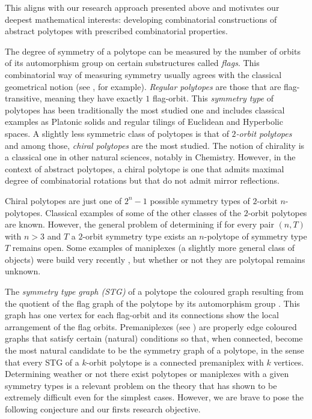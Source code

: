 \documentclass[a4paper,12pt,english]{article}
\begin{document}
This aligns with our research approach presented above and motivates our deepest mathematical interests: developing combinatorial constructions of abstract polytopes with prescribed combinatorial properties.





The degree of symmetry of a polytope can be measured by the number of orbits of its automorphism group on certain substructures called \emph{flags}.
This combinatorial way of measuring symmetry usually agrees with the classical geometrical notion (see \cite{DuVal1964_HomographiesQuaternionsRotations,Coxeter1973_RegularPolytopes,Coxeter1991_RegularComplexPolytopes}, for example).
\emph{Regular polytopes} are those that are flag-transitive, meaning they have exactly $1$ flag-orbit.
This \emph{symmetry type} of polytopes has been traditionally the most studied one and includes classical examples as Platonic solids and regular tilings of Euclidean and Hyperbolic spaces.
A slightly less symmetric class of polytopes is that of \emph{$2$-orbit polytopes} and among those, \emph{chiral polytopes} are the most studied.
The notion of chirality is a classical one in other natural sciences, notably in Chemistry.
However, in the context of abstract polytopes, a chiral polytope is one that admits maximal degree of combinatorial rotations but that do not admit mirror reflections.

Chiral polytopes are just one of $2^{n}-1$ possible symmetry types of $2$-orbit $n$-polytopes.
Classical examples of some of the other classes of the $2$-orbit polytopes are known.
However, the general problem of determining if for every pair $(n,T)$ with $n>3$ and $T$ a $2$-orbit symmetry type  exists an $n$-polytope of symmetry type $T$ remains open.
Some examples of maniplexes (a slightly more general class of objects) were build very recently \cite{PellPotTol2019_ExistenceResultTwo}, but whether or not they are polytopal remains unknown.

The \emph{symmetry type graph (STG)} of a polytope the coloured graph resulting from the quotient of the flag graph  of the polytope by its automorphism group
\cite{CunDelHuTo2015_SymmetryTypeGraphs}.
This graph has one vertex for each flag-orbit and its connections show the local arrangement of the flag orbits. Premaniplexes (see \cite{HubaMocMon2023_VoltageOperationsManiplexes,HubarMocha2023_AllPolytopesAre}) are properly edge coloured graphs that satisfy certain (natural) conditions so that, when connected, become the most natural candidate to be the symmetry graph of a polytope, in the sense that every STG of a $k$-orbit polytope is a connected premaniplex with $k$ vertices.
Determining weather or not there exist polytopes or maniplexes with a given symmetry types is a relevant problem on the theory that has shown to be extremely difficult even for the simplest cases.
However, we are brave to pose the following conjecture and our firsts research objective.
\end{document}
